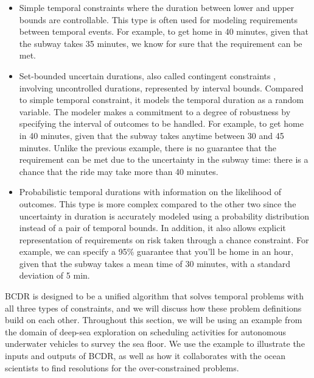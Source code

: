 \documentclass[jair,twoside,11pt,theapa]{article}
\begin{document}
\begin{itemize}
	
	\item Simple temporal constraints \cite{Dechter_TCN_1991} where the duration between lower and upper
	bounds are controllable. This type is often used for modeling requirements
	between temporal events. For example, to get home in 40 minutes, given that the
	subway takes 35 minutes, we know for sure that the requirement can be met.
	
	
	\item Set-bounded uncertain durations, also called contingent constraints \cite{Vidal99handlingcontingency},
	involving uncontrolled durations, represented by interval bounds. Compared to
	simple temporal constraint, it models the temporal duration as a random
	variable. The modeler makes a commitment to a degree of robustness by
	specifying the interval of outcomes to be handled. For example, to get home in
	40 minutes, given that the subway takes anytime between 30 and 45 minutes.
	Unlike the previous example, there is no guarantee that the requirement can be
	met due to the uncertainty in the subway time: there is a chance that the ride
	may take more than 40 minutes.
	
	
	\item Probabilistic temporal durations \cite{Tsamardinos02aprobabilistic} with information on the likelihood of
	outcomes. This type is more complex compared to the other two since the
	uncertainty in duration is accurately modeled using a probability distribution
	instead of a pair of temporal bounds. In addition, it also allows explicit
	representation of requirements on risk taken through a chance constraint. For
	example, we can specify a 95\% guarantee that you'll be home in an hour, given
	that the subway takes a mean time of 30 minutes, with a standard deviation of 5
	min.
	
\end{itemize}



BCDR is designed to be a unified algorithm that solves temporal problems with
all three types of constraints, and we will discuss how these problem
definitions build on each other. Throughout this section, we will be using an
example from the domain of deep-sea exploration on scheduling activities for
autonomous underwater vehicles to survey the sea floor. We use the example to
illustrate the inputs and outputs of BCDR, as well as how it collaborates with
the ocean scientists to find resolutions for the over-constrained problems.
\end{document}
